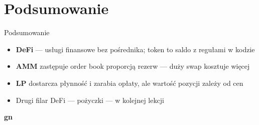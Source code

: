 \section{Podsumowanie}

\begin{frame}{Podsumowanie}
  \begin{itemize}
    \item \textbf{DeFi} --- usługi finansowe bez pośrednika; token to saldo z regułami w kodzie
    \item \textbf{AMM} zastępuje order book proporcją rezerw --- duży swap kosztuje więcej
    \item \textbf{LP} dostarcza płynność i zarabia opłaty, ale wartość pozycji zależy od cen
    \item Drugi filar DeFi --- pożyczki --- w kolejnej lekcji
  \end{itemize}
\end{frame}

\begin{frame}[plain]
  \begin{center}
    \vfill
    {\Huge\bfseries\color{stplwhite} gn}
    \vfill
  \end{center}
\end{frame}


